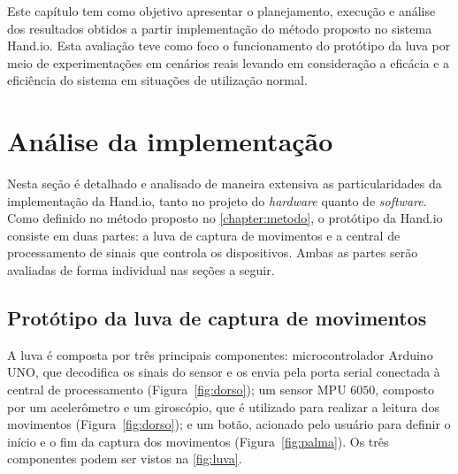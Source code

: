 \label{chapter:resultados}

Este capítulo tem como objetivo apresentar o planejamento, execução e análise dos resultados obtidos a partir implementação do método proposto no sistema Hand.io. Esta avaliação teve como foco o funcionamento do protótipo da luva por meio de experimentações em cenários reais levando em consideração a eficácia e a eficiência do sistema em situações de utilização normal.

\section{Análise da implementação}

Nesta seção é detalhado e analisado de maneira extensiva as particularidades da implementação da Hand.io, tanto no projeto do \textit{hardware} quanto de \textit{software}.
% 
% 
Como definido no método proposto no \autoref{chapter:metodo}, o protótipo da Hand.io consiste em duas partes: a luva de captura de movimentos e a central de processamento de sinais que controla os dispositivos. Ambas as partes serão avaliadas de forma individual nas seções a seguir.

\subsection{Protótipo da luva de captura de movimentos}

A luva é composta por três principais componentes: 
microcontrolador Arduino UNO, que decodifica os sinais do sensor e os envia pela porta serial conectada à central de processamento (Figura~\ref{fig:dorso}); 
um sensor MPU $6050$, composto por um acelerômetro e um giroscópio, que é utilizado para realizar a leitura dos movimentos (Figura~\ref{fig:dorso}); e 
um botão, acionado pelo usuário para definir o início e o fim da captura dos movimentos (Figura~\ref{fig:palma}). Os três componentes podem ser vistos na \autoref{fig:luva}.

